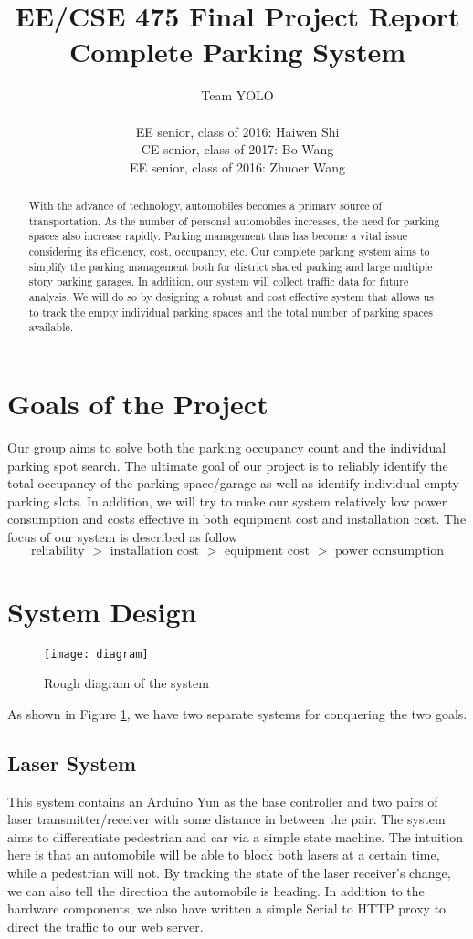 \documentclass[12pt, a4paper]{article}
\title{EE/CSE 475 Final Project Report
		\\Complete Parking System}
\author{Team YOLO\\\\EE senior, class of 2016: Haiwen Shi \\CE senior, class of 2017: Bo Wang \\EE senior, class of 2016: Zhuoer Wang}
\date{}
\begin{document}
\maketitle
\begin{abstract}
With the advance of technology, automobiles becomes a primary source of transportation. As the number of personal automobiles increases, the  need for parking spaces also increase rapidly. Parking management thus has become a vital issue considering its efficiency, cost, occupancy, etc. Our complete parking system aims to simplify the parking management both for district shared parking and large multiple story parking garages. In addition, our system will collect traffic data for future analysis. We will do so by designing a robust and cost effective system that allows us to track the empty individual parking spaces and the total number of parking spaces available.
\end{abstract}
\newpage
\tableofcontents
\newpage
\section{Goals of the Project}
Our group aims to solve both the parking occupancy count and the individual parking spot search. The ultimate goal of our project is to reliably identify the total occupancy of the parking space/garage as well as identify individual empty parking slots. In addition, we will try to make our system relatively low power consumption and costs effective in both equipment cost and installation cost. The focus of our system is described as follow
\begin{equation*}
	\text{reliability }>\text{ installation cost }>\text{ equipment cost }>\text{ power consumption}
\end{equation*}
\section{System Design}
\begin{figure}[ht!]
	\centering
	\texttt{[image: diagram]}
	\caption{Rough diagram of the system}
	\label{fig:diagram}
\end{figure}
As shown in Figure \ref{fig:diagram}, we have two separate systems for conquering the two goals.
\subsection{Laser System} 
This system contains an Arduino Yun as the base controller and two pairs of laser transmitter/receiver with some distance in between the pair. The system aims to differentiate pedestrian and car via a simple state machine. The intuition here is that an automobile will be able to block both lasers at a certain time, while a pedestrian will not. By tracking the state of the laser receiver's change, we can also tell the direction the automobile is heading. In addition to the hardware components, we also have written a simple Serial to HTTP proxy to direct the traffic to our web server.
\end{document}
